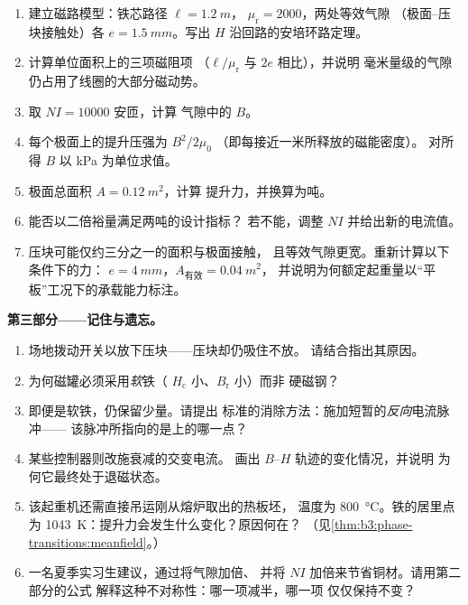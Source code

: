 \begin{problem}
\begin{enumerate}[resume]
  \item 建立磁路模型：铁芯路径 $\ell = \qty{1.2}{m}$，
        $\mu_{\text{r}} = 2000$，两处等效气隙
        （极面–压块接触处）各 $e = \qty{1.5}{mm}$。写出
        $H$ 沿回路的安培环路定理。
  \item 计算单位面积上的三项磁阻项
        （$\ell/\mu_{\text{r}}$ 与 $2e$ 相比），并说明
        毫米量级的气隙仍占用了线圈的大部分磁动势。
  \item 取 $NI = \num{10000}$ 安匝，计算
        气隙中的 $B$。
  \item 每个极面上的提升压强为 $B^2/2\mu_0$
        （即每接近一米所释放的磁能密度）。
        对所得 $B$ 以 \unit{kPa} 为单位求值。
  \item 极面总面积 $A = \qty{0.12}{m^2}$，计算
        提升力，并换算为吨。
  \item 能否以二倍裕量满足两吨的设计指标？
        若不能，调整 $NI$ 并给出新的电流值。
  \item 压块可能仅约三分之一的面积与极面接触，
        且等效气隙更宽。重新计算以下条件下的力：
        $e = \qty{4}{mm}$，$A_{\text{有效}} = \qty{0.04}{m^2}$，
        并说明为何额定起重量以“平板”工况下的承载能力标注。
\end{enumerate}

\medskip\noindent\textbf{第三部分——记住与遗忘。}

\begin{enumerate}[resume]
  \item 场地拨动开关以放下压块——压块却仍吸住不放。
        请结合指出其原因。
  \item 为何磁罐必须采用\emph{软}铁（
        $H_{\text{c}}$ 小、$B_{\text{r}}$ 小）而非
        硬磁钢？
  \item 即便是软铁，仍保留少量。请提出
        标准的消除方法：施加短暂的\emph{反向}电流脉冲——
        该脉冲所指向的是上的哪一点？
  \item 某些控制器则改施衰减的交变电流。
        画出 $B$--$H$ 轨迹的变化情况，并说明
        为何它最终处于退磁状态。
  \item 该起重机还需直接吊运刚从熔炉取出的热板坯，
        温度为 \qty{800}{\celsius}。铁的居里点为
        \qty{1043}{K}：提升力会发生什么变化？原因何在？
        （见\cref{thm:b3:phase-transitions:meanfield}。）
  \item 一名夏季实习生建议，通过将气隙加倍、
        并将 $NI$ 加倍来节省铜材。请用第二部分的公式
        解释这种不对称性：哪一项减半，哪一项
        仅仅保持不变？
\end{enumerate}


\end{problem}

